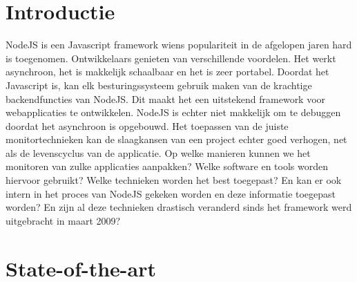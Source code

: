 
\section{Introductie} %
\label{sec:introductie}

NodeJS is een Javascript framework wiens populariteit in de afgelopen jaren hard is toegenomen. Ontwikkelaars genieten van verschillende voordelen. Het werkt asynchroon, het is makkelijk schaalbaar en het is zeer portabel. Doordat het Javascript is, kan elk besturingssysteem gebruik maken van de krachtige backendfuncties van NodeJS. Dit maakt het een uitstekend framework voor webapplicaties te ontwikkelen.  NodeJS is echter niet makkelijk om te debuggen doordat het asynchroon is opgebouwd. Het toepassen van de juiste monitortechnieken kan de slaagkansen van een project echter goed verhogen, net als de levenscyclus van de applicatie. Op welke manieren kunnen we het monitoren van zulke applicaties aanpakken? Welke software en tools worden hiervoor gebruikt? Welke technieken worden het best toegepast? En kan er ook intern in het proces van NodeJS gekeken worden en deze informatie toegepast worden? En zijn al deze technieken drastisch veranderd sinds het framework werd uitgebracht in maart 2009? 


\section{State-of-the-art}
\label{sec:state-of-the-art}

